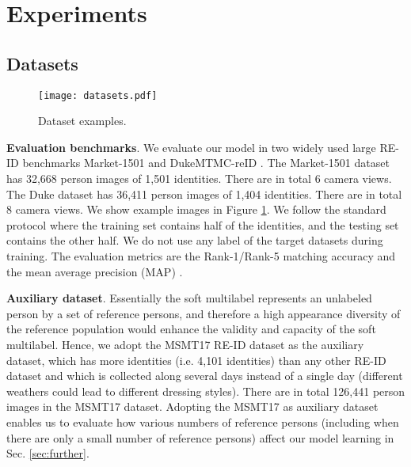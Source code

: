 \documentclass[10pt,twocolumn,letterpaper]{article}
\begin{document}
\section{Experiments}

\subsection{Datasets}

\begin{figure}[t]
\begin{center}
\vspace{-0.2cm}
\texttt{[image: datasets.pdf]}
\end{center}
\vspace{-0.5cm}
   \caption{Dataset examples.
   }
\label{fig:datasets}
\vspace{-0.68cm}
\end{figure}

\noindent
\textbf{Evaluation benchmarks}.
We evaluate our model in two widely used large RE-ID benchmarks
Market-1501 \cite{2015_ICCV_MARKET}
and DukeMTMC-reID \cite{Duke1,Duke2}.
The Market-1501 dataset has 32,668 person images of 1,501 identities.
There are in total 6 camera views.
The Duke dataset has 36,411 person images of 1,404 identities.
There are in total 8 camera views.
We show example images in Figure \ref{fig:datasets}.
We follow the standard protocol \cite{2015_ICCV_MARKET,Duke1} where the training set contains half of the identities,
and the testing set contains the other half.
We do not use any label of the target datasets during training.
The evaluation metrics are the Rank-1/Rank-5 matching accuracy and the mean average precision (MAP) \cite{2015_ICCV_MARKET}.

\vspace{0.1cm}
\noindent
\textbf{Auxiliary dataset}.
Essentially the soft multilabel represents an unlabeled person by a set of reference persons,
and therefore a high appearance diversity of the reference population would enhance the validity and capacity of the soft multilabel.
Hence, we adopt the
MSMT17 \cite{2018_CVPR_PTGAN} RE-ID dataset as the auxiliary dataset,
which has more identities (i.e. 4,101 identities) than any other RE-ID dataset and which is collected along several days
instead of a single day (different weathers could lead to different dressing styles).
There are in total 126,441 person images in the MSMT17 dataset.
Adopting the MSMT17 as auxiliary dataset enables us to evaluate
how various numbers of reference persons
(including when there are only a small number of reference persons) affect our model learning
in Sec. \ref{sec:further}.
\end{document}
